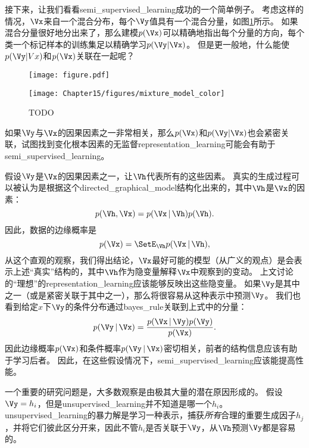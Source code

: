 接下来，让我们看看\gls{semi_supervised_learning}成功的一个简单例子。
考虑这样的情况，$\Vx$来自一个混合分布，每个$\Vy$值具有一个混合分量，如图\ref{fig:chap15_mixture_model}所示。
如果混合分量很好地分出来了，那么建模$p(\Vx)$可以精确地指出每个分量的方向，每个类一个标记样本的训练集足以精确学习$p(\Vy | \Vx)$。
但是更一般地，什么能使$p(\Vy | Vx)$和$p(\Vx)$关联在一起呢？

\begin{figure}[!htb]
\ifOpenSource
\centerline{\texttt{[image: figure.pdf]}}
\else
\centerline{\texttt{[image: Chapter15/figures/mixture\_model\_color]}}
\fi
\caption{TODO}
\label{fig:chap15_mixture_model}
\end{figure}

如果$\Vy$与$\Vx$的因果因素之一非常相关，那么$p(\Vx)$和$p(\Vy | \Vx)$也会紧密关联，试图找到变化根本因素的无监督\gls{representation_learning}可能会有助于\gls{semi_supervised_learning}。


假设$\Vy$是$\Vx$的因果因素之一，让$\Vh$代表所有的这些因素。
真实的生成过程可以被认为是根据这个\gls{directed_graphical_model}结构化出来的，其中$\Vh$是$\Vx$的因素：
\begin{equation}
	p(\Vh, \Vx) = p(\Vx \,|\, \Vh) p(\Vh).
\end{equation}
因此，数据的边缘概率是
\begin{equation}
	p(\Vx) = \SetE_{\Vh} p(\Vx\, |\, \Vh),
\end{equation}
从这个直观的观察，我们得出结论，$\Vx$最好可能的模型（从广义的观点）是会表示上述“真实”结构的，其中$\Vh$作为隐变量解释$\Vx$中观察到的变动。
上文讨论的“理想”的\gls{representation_learning}应该能够反映出这些隐变量。
如果$\Vy$是其中之一（或是紧密关联于其中之一），那么将很容易从这种表示中预测$\Vy$。
我们也看到给定$x$下$\Vy$的条件分布通过\gls{bayes_rule}关联到上式中的分量：
\begin{equation}
	p(\Vy \,|\, \Vx) = \frac{ p(\Vx\, |\, \Vy) p(\Vy) }{p(\Vx)}.
\end{equation}
因此边缘概率$p(\Vx)$和条件概率$p(\Vy \,|\, \Vx)$密切相关，前者的结构信息应该有助于学习后者。
因此，在这些假设情况下，\gls{semi_supervised_learning}应该能提高性能。


一个重要的研究问题是，大多数观察是由极其大量的潜在原因形成的。
假设$\Vy = h_i$，但是\gls{unsupervised_learning}并不知道是哪一个$h_i$。
\gls{unsupervised_learning}的暴力解是学习一种表示，捕获\emph{所有}合理的重要生成因子$h_j$，并将它们彼此区分开来，因此不管$h_i$是否关联于$\Vy$，从$\Vh$预测$\Vy$都是容易的。

